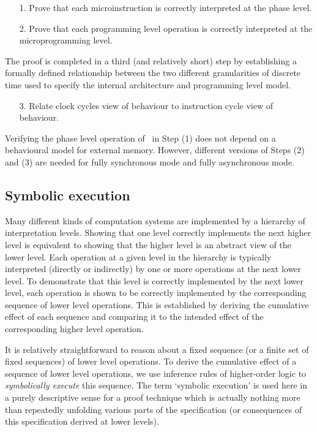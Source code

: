 \begin{enumerate}
\item[1.] Prove that each microinstruction is correctly interpreted at the
phase level.
\item[2.] Prove that each programming level operation is correctly interpreted
at the\\
microprogramming level.
\end{enumerate}

The proof is completed in a third (and relatively short) step
by establishing a formally defined relationship between
the two different granularities of discrete time used to specify
the internal architecture and programming level model.

\begin{enumerate}
\item[3.]
Relate clock cycles view of behaviour to instruction cycle view of behaviour.
\end{enumerate}

Verifying the phase level operation of \Tamarack\ in Step (1)
does not depend on a behavioural model for external memory.
However, different versions of Steps (2) and (3) are needed
for fully synchronous mode and fully asynchronous mode.

\subsection{Symbolic execution}
\label{sec-symbolic}

Many different kinds of computation systems are implemented by a hierarchy of
interpretation levels.
Showing that one level correctly implements the next higher level
is equivalent to showing that the higher level is an abstract
view of the lower level.
Each operation at a given level in the hierarchy is typically interpreted
(directly or indirectly) by one or more operations at the next lower level.
To demonstrate that this level is correctly implemented by the next
lower level,
each operation is shown to be correctly
implemented by the corresponding sequence
of lower level operations.
This is established by deriving the
cumulative effect of each sequence and comparing
it to the intended effect of the corresponding higher level operation.

It is relatively straightforward to reason about a fixed sequence
(or a finite set of fixed sequences) of lower level operations.
To derive the cumulative effect of a sequence of lower level operations,
we use inference rules of
higher-order logic to {\it symbolically execute} this sequence.
The term
`symbolic execution' is used here in a purely descriptive sense
for a proof technique
which is actually nothing more than
repeatedly unfolding various parts of the
specification (or consequences of this specification derived
at lower levels).

